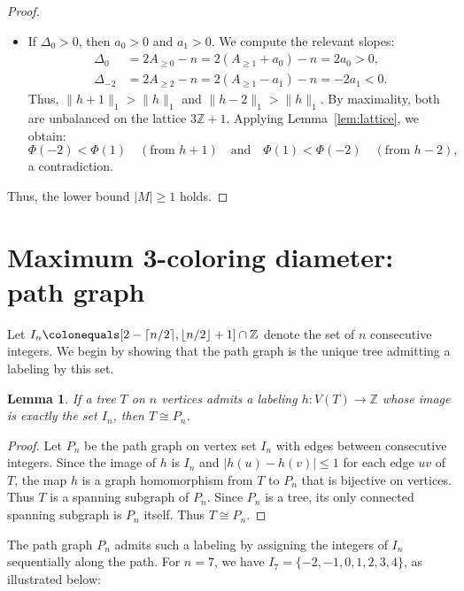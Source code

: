 \documentclass[12pt,reqno]{amsart}
\newtheorem{lem}[thm]{Lemma}
\theoremstyle{definition}
\newcommand{\Z}{\mathbb{Z}}
\begin{document}
\begin{proof}
\begin{itemize}
    \item If $\Delta_0 > 0$, then $a_0 > 0$ and $a_1 > 0$. We compute the relevant slopes:
    \begin{align*}
        \Delta_0 &= 2A_{\ge 0} - n = 2(A_{\ge 1} + a_0) - n = 2a_0 > 0, \\ 
        \Delta_{-2} &= 2A_{\ge 2} - n = 2(A_{\ge 1} - a_1) - n = -2a_1 < 0.
    \end{align*}
    Thus, $\|h+1\|_1 > \|h\|_1$ and $\|h-2\|_1 > \|h\|_1$. By maximality, both are unbalanced on the lattice $3\Z+1$. Applying Lemma~\ref{lem:lattice}, we obtain:
    \[
       \Phi(-2) < \Phi(1) \quad (\text{from } h+1) 
       \quad \text{and} \quad
       \Phi(1) < \Phi(-2) \quad (\text{from } h-2),
    \]
    a contradiction.
\end{itemize}
Thus, the lower bound $|M| \ge 1$ holds. \end{proof}

\section{Maximum 3-coloring diameter: path graph}\label{sec:maximum-3-coloring-diameter}

Let $I_n \colonequals [2-\lceil n/2\rceil, \lfloor n/2\rfloor+1]\cap\mathbb{Z}$ denote the set of $n$ consecutive integers. We begin by showing that the path graph is the unique tree admitting a labeling by this set.

\begin{lem}\label{lem:path-unique}
If a tree $T$ on $n$ vertices admits a labeling $h\colon V(T)\to \mathbb{Z}$ whose image is exactly the set $I_n$, then $T \cong P_n$.
\end{lem}

\begin{proof}
Let $P_n$ be the path graph on vertex set $I_n$ with edges between consecutive integers. Since the image of $h$ is $I_n$ and $|h(u)-h(v)|\le 1$ for each edge $uv$ of $T$, the map $h$ is a graph homomorphism from $T$ to $P_n$ that is bijective on vertices. Thus $T$ is a spanning subgraph of $P_n$. Since $P_n$ is a tree, its only connected spanning subgraph is $P_n$ itself. Thus $T \cong P_n$.
\end{proof}

The path graph $P_n$ admits such a labeling by assigning the integers of $I_n$ sequentially along the path. For $n=7$, we have $I_7 = \{-2, -1, 0, 1, 2, 3, 4\}$, as illustrated below:

\end{document}
